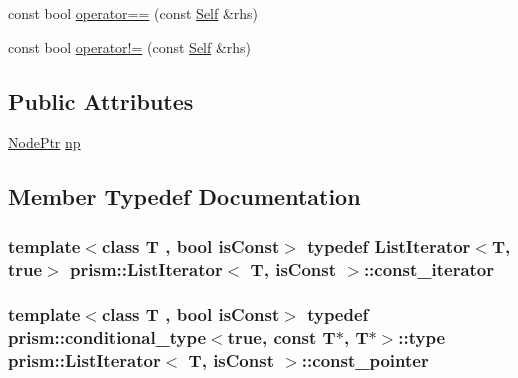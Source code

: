 \begin{DoxyCompactItemize}
\item 
const bool \hyperlink{structprism_1_1_list_iterator_a52ef1ed3d02cf157aea4866c26905b59}{operator==} (const \hyperlink{structprism_1_1_list_iterator_a54dfed5d1937a612aa2ae524b55f8087}{Self} \&rhs)
\item 
const bool \hyperlink{structprism_1_1_list_iterator_a888245e7f95a39274c5b26863f84d84c}{operator!=} (const \hyperlink{structprism_1_1_list_iterator_a54dfed5d1937a612aa2ae524b55f8087}{Self} \&rhs)
\end{DoxyCompactItemize}
\subsection*{Public Attributes}
\begin{DoxyCompactItemize}
\item 
\hyperlink{structprism_1_1_list_iterator_aad2175a44d3db4fd84059ae15158b174}{Node\+Ptr} \hyperlink{structprism_1_1_list_iterator_a62ec8f8f950cd91c3cde64ce4d512136}{np}
\end{DoxyCompactItemize}


\subsection{Member Typedef Documentation}
\subsubsection[{\texorpdfstring{const\+\_\+iterator}{const_iterator}}]{\setlength{\rightskip}{0pt plus 5cm}template$<$class T , bool is\+Const$>$ typedef {\bf List\+Iterator}$<$T, true$>$ {\bf prism\+::\+List\+Iterator}$<$ T, is\+Const $>$\+::{\bf const\+\_\+iterator}}\hypertarget{structprism_1_1_list_iterator_aec39e76f7b988d0718fa4e2aea52ed34}{}\label{structprism_1_1_list_iterator_aec39e76f7b988d0718fa4e2aea52ed34}
\subsubsection[{\texorpdfstring{const\+\_\+pointer}{const_pointer}}]{\setlength{\rightskip}{0pt plus 5cm}template$<$class T , bool is\+Const$>$ typedef {\bf prism\+::conditional\+\_\+type}$<$true, const T$\ast$, T$\ast$$>$\+::type {\bf prism\+::\+List\+Iterator}$<$ T, is\+Const $>$\+::{\bf const\+\_\+pointer}}\hypertarget{structprism_1_1_list_iterator_a26d33cfdcd623863581237968e482a60}{}\label{structprism_1_1_list_iterator_a26d33cfdcd623863581237968e482a60}
